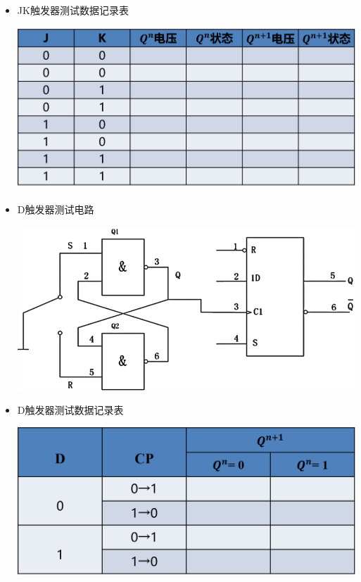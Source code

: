\documentclass[UTF8]{ctexart}
\begin{document}
\begin{enumerate}
\begin{itemize}
                  \item JK触发器测试数据记录表  
                        \begin{center}
                              \includegraphics[scale = 0.6]{7.png}
                              \label{fig:label}
                        \end{center}
                  \item D触发器测试电路  
                        \begin{center}
                              \includegraphics[scale = 0.6]{8.png}
                              \label{fig:label}
                        \end{center}
                  \item D触发器测试数据记录表  
                        \begin{center}
                              \includegraphics[scale = 0.6]{9.png}
                              \label{fig:label}
                        \end{center}
            \end{itemize}
\end{enumerate}
\end{document}
